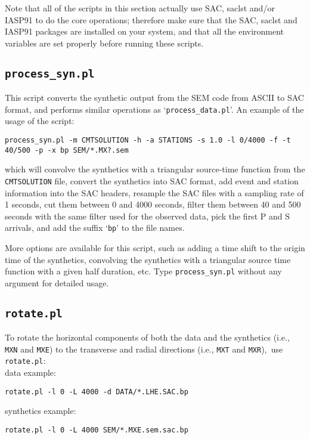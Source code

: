 Note that all of the scripts in this section actually use SAC,
saclst and/or IASP91 to do the core operations; therefore make sure
that the SAC, saclst and IASP91 packages are installed on your
system, and that all the environment variables are set properly before
running these scripts.


\subsection{\texttt{process\_syn.pl}}\label{sub:process_syn.pl}

This script converts the synthetic output from the SEM code from ASCII
to SAC format, and performs similar operations as `\texttt{process\_data.pl}'.
An example of the usage of the script:

{\footnotesize
\begin{verbatim}
process_syn.pl -m CMTSOLUTION -h -a STATIONS -s 1.0 -l 0/4000 -f -t 40/500 -p -x bp SEM/*.MX?.sem
\end{verbatim}
}

\noindent
which will convolve the synthetics with a triangular source-time function
from the \texttt{CMTSOLUTION} file, convert the synthetics into SAC
format, add event and station information into the SAC headers, resample the SAC files with a sampling rate of 1 seconds, cut them between 0 and 4000 seconds, filter them between 40 and
500 seconds with the same filter used for the observed data, pick the first P and S arrivals, and add the suffix `\texttt{bp}'
to the file names.

More options are available for this script, such as adding a time shift
to the origin time of the synthetics, convolving the synthetics with
a triangular source time function with a given half duration, etc.
Type \texttt{process\_syn.pl} without any argument for detailed
usage.


\subsection{\texttt{rotate.pl}}

To rotate the horizontal components of both the data and the synthetics
(i.e., \texttt{MXN} and \texttt{MXE}) to the transverse and radial directions (i.e., \texttt{MXT} and \texttt{MXR}),\texttt{\small{}
}use{\small{} }\texttt{\small rotate.pl}:\\

\noindent
data example:
\begin{verbatim}
rotate.pl -l 0 -L 4000 -d DATA/*.LHE.SAC.bp
\end{verbatim}
synthetics example:
\begin{verbatim}
rotate.pl -l 0 -L 4000 SEM/*.MXE.sem.sac.bp
\end{verbatim}

